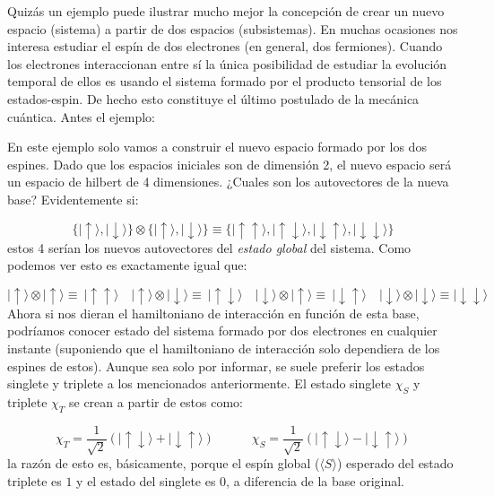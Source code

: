 \documentclass[12pt]{book}
\numberwithin{equation}{chapter}
\numberwithin{figure}{chapter}
\newcommand{\tquad}{\quad \quad \quad}
\newcommand{\parentesis}[1]{\left( #1  \right)}
\newcommand{\eup}{\mid \uparrow \rangle}
\newcommand{\edw}{\mid \downarrow \rangle}
\newcommand{\eupdw}{\mid \uparrow \downarrow \rangle}
\newcommand{\edwup}{\mid \downarrow \uparrow \rangle}
\begin{document}
Quizás un ejemplo puede ilustrar mucho mejor la concepción de crear un nuevo espacio (sistema) a partir de dos espacios (subsistemas). En muchas ocasiones nos interesa estudiar el espín de dos electrones (en general, dos fermiones). Cuando los electrones interaccionan entre sí la única posibilidad de estudiar la evolución temporal de ellos es usando el sistema formado por el producto tensorial de los estados-espin. De hecho esto constituye el último postulado de la mecánica cuántica. Antes el ejemplo: \\



\hrulefill

En este ejemplo solo vamos a construir el nuevo espacio formado por los dos espines. Dado que los espacios iniciales son de dimensión 2, el nuevo espacio será un espacio de hilbert de 4 dimensiones. ¿Cuales son los autovectores de la nueva base? Evidentemente si:

$$ \{ \eup, \edw \} \otimes \{ \eup , \edw \}  \equiv \{  \mid \uparrow \uparrow \rangle,  \mid \uparrow \downarrow\rangle,  \mid \downarrow \uparrow \rangle,   \mid\downarrow \downarrow \rangle \}$$
estos 4 serían los nuevos autovectores del \textit{estado global} del sistema. Como podemos ver esto es exactamente igual que:

$$ \eup \otimes \eup \equiv  \ \mid \uparrow \uparrow \rangle \quad \eup \otimes \edw \equiv \  \mid \uparrow \downarrow\rangle \quad \edw \otimes \eup \equiv \ \mid \downarrow \uparrow \rangle \quad \edw \otimes \edw \equiv   \mid\downarrow \downarrow \rangle $$
Ahora si nos dieran el hamiltoniano de interacción en función de esta base, podríamos conocer estado del sistema formado por dos electrones en cualquier instante  (suponiendo que el hamiltoniano de interacción solo dependiera de los espines de estos). Aunque sea solo por informar, se suele preferir los estados singlete y triplete a los mencionados anteriormente. El estado singlete $\chi_S$ y triplete $\chi_T$ se crean a partir de estos como:

\begin{equation}
\chi_T = \frac{1}{\sqrt{2}} \parentesis{\eupdw + \edwup } \tquad \chi_S = \frac{1}{\sqrt{2}} \parentesis{\eupdw - \edwup }
\end{equation}
la razón de esto es, básicamente, porque el espín global ($\langle S \rangle$) esperado del estado triplete es $1$ y el estado del singlete es 0, a diferencia de la base original. 

\hrulefill \\
\end{document}
